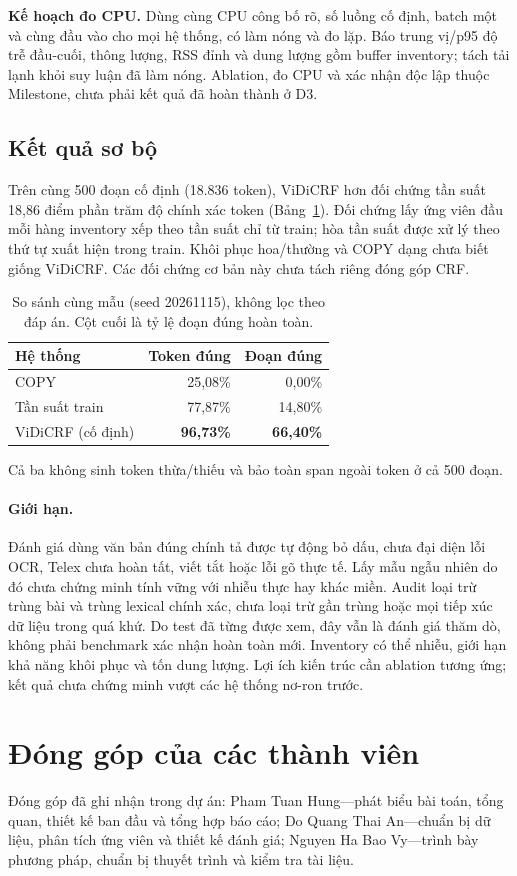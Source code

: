 \documentclass{article}
\begin{document}
\textbf{Kế hoạch đo CPU.} Dùng cùng CPU công bố rõ, số luồng cố định, batch một và cùng đầu vào cho mọi hệ thống, có làm nóng và đo lặp. Báo trung vị/p95 độ trễ đầu-cuối, thông lượng, RSS đỉnh và dung lượng gồm buffer inventory; tách tải lạnh khỏi suy luận đã làm nóng. Ablation, đo CPU và xác nhận độc lập thuộc Milestone, chưa phải kết quả đã hoàn thành ở D3.

\subsection{Kết quả sơ bộ}
Trên cùng 500 đoạn cố định (18.836 token), ViDiCRF hơn đối chứng tần suất 18,86 điểm phần trăm độ chính xác token (Bảng~\ref{tab:preliminary}). Đối chứng lấy ứng viên đầu mỗi hàng inventory xếp theo tần suất chỉ từ train; hòa tần suất được xử lý theo thứ tự xuất hiện trong train. Khôi phục hoa/thường và COPY dạng chưa biết giống ViDiCRF. Các đối chứng cơ bản này chưa tách riêng đóng góp CRF.
\begin{table}[!ht]
\caption{So sánh cùng mẫu (seed 20261115), không lọc theo đáp án. Cột cuối là tỷ lệ đoạn đúng hoàn toàn.}
\label{tab:preliminary}
\centering
\begin{tabular}{lrr}
\toprule
Hệ thống & Token đúng & Đoạn đúng\\
\midrule
COPY & 25,08\% & 0,00\%\\
Tần suất train & 77,87\% & 14,80\%\\
ViDiCRF (cố định) & \textbf{96,73\%} & \textbf{66,40\%}\\
\bottomrule
\end{tabular}
\end{table}
Cả ba không sinh token thừa/thiếu và bảo toàn span ngoài token ở cả 500 đoạn.

\paragraph{Giới hạn.}
Đánh giá dùng văn bản đúng chính tả được tự động bỏ dấu, chưa đại diện lỗi OCR, Telex chưa hoàn tất, viết tắt hoặc lỗi gõ thực tế. Lấy mẫu ngẫu nhiên do đó chưa chứng minh tính vững với nhiễu thực hay khác miền. Audit loại trừ trùng bài và trùng lexical chính xác, chưa loại trừ gần trùng hoặc mọi tiếp xúc dữ liệu trong quá khứ. Do test đã từng được xem, đây vẫn là đánh giá thăm dò, không phải benchmark xác nhận hoàn toàn mới. Inventory có thể nhiễu, giới hạn khả năng khôi phục và tốn dung lượng. Lợi ích kiến trúc cần ablation tương ứng; kết quả chưa chứng minh vượt các hệ thống nơ-ron trước.

\begin{minipage}{\columnwidth}
\section*{Đóng góp của các thành viên}
Đóng góp đã ghi nhận trong dự án: Pham Tuan Hung---phát biểu bài toán, tổng quan, thiết kế ban đầu và tổng hợp báo cáo; Do Quang Thai An---chuẩn bị dữ liệu, phân tích ứng viên và thiết kế đánh giá; Nguyen Ha Bao Vy---trình bày phương pháp, chuẩn bị thuyết trình và kiểm tra tài liệu.
\end{minipage}



\end{document}
